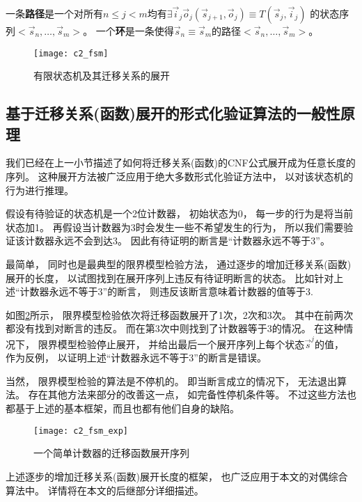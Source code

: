 一条\textbf{路径}是一个对所有$n\le j< m$均有$\exists \vec{i}_j\vec{o}_j (\vec{s}_{j+1},\vec{o}_j)\equiv T(\vec{s}_j,\vec{i}_j)$ 的状态序列$<\vec{s}_n,\dots,\vec{s}_m>$。
一个\textbf{环}是一条使得$\vec{s}_n\equiv \vec{s}_m$的路径$<\vec{s}_n,\dots,\vec{s}_m>$。


\begin{figure}[t]
  \centering
  \texttt{[image: c2\_fsm]}
  \caption{有限状态机及其迁移关系的展开}
  \label{c2_fsm}
\end{figure}



\subsection{基于迁移关系(函数)展开的形式化验证算法的一般性原理}\label{subsec_trexp_chap1}
我们已经在上一小节描述了如何将迁移关系(函数)的CNF公式展开成为任意长度的序列。
这种展开方法被广泛应用于绝大多数形式化验证方法中，
以对该状态机的行为进行推理。

假设有待验证的状态机是一个2位计数器，
初始状态为0，
每一步的行为是将当前状态加1。
再假设当计数器为3时会发生一些不希望发生的行为，
所以我们需要验证该计数器永远不会到达3。
因此有待证明的断言是“计数器永远不等于3”。

最简单，
同时也是最典型的限界模型检验方法，
通过逐步的增加迁移关系(函数)展开的长度，
以试图找到在展开序列上违反有待证明断言的状态。
比如针对上述“计数器永远不等于3”的断言，
则违反该断言意味着计数器的值等于3.

如图\ref{c2_fsm_exp}所示，
限界模型检验依次将迁移函数展开了1次，2次和3次。
其中在前两次都没有找到对断言的违反。
而在第3次中则找到了计数器等于3的情况。
在这种情况下，
限界模型检验停止展开，
并给出最后一个展开序列上每个状态$\vec{s}^j$的值，
作为反例，
以证明上述“计数器永远不等于3”的断言是错误。

当然，
限界模型检验的算法是不停机的。
即当断言成立的情况下，
无法退出算法。
存在其他方法来部分的改善这一点，
如完备性停机条件等。
不过这些方法也都基于上述的基本框架，而且也都有他们自身的缺陷。

\begin{figure}[t]
  \centering
  \texttt{[image: c2\_fsm\_exp]}
  \caption{一个简单计数器的迁移函数展开序列}
  \label{c2_fsm_exp}
\end{figure}

上述逐步的增加迁移关系(函数)展开长度的框架，
也广泛应用于本文的对偶综合算法中。
详情将在本文的后继部分详细描述。

